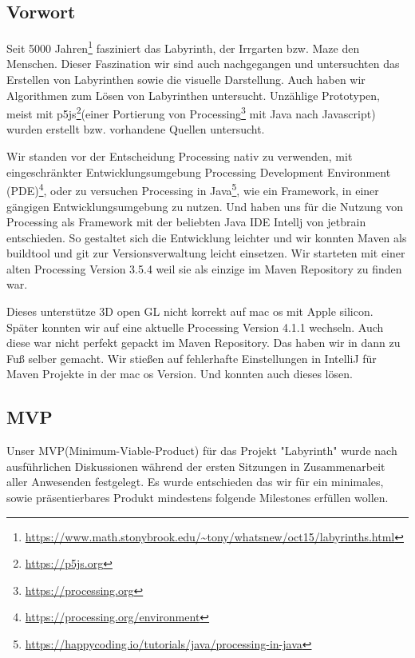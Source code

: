 
\subsection{Vorwort}\label{subsec:Vorwort}

Seit 5000 Jahren\footnote{\url{https://www.math.stonybrook.edu/~tony/whatsnew/oct15/labyrinths.html}} fasziniert das Labyrinth, der Irrgarten bzw. Maze den Menschen. Dieser Faszination wir sind auch nachgegangen und untersuchten das Erstellen von Labyrinthen sowie die visuelle Darstellung. Auch haben wir Algorithmen zum Lösen von Labyrinthen untersucht. Unzählige Prototypen, meist mit p5js\footnote{\url{https://p5js.org}}(einer Portierung von Processing\footnote{\url{https://processing.org}}  mit Java nach Javascript)  wurden erstellt bzw.  vorhandene Quellen untersucht.

	Wir standen vor der Entscheidung Processing nativ zu verwenden, mit eingeschränkter Entwicklungsumgebung Processing Development Environment (PDE)\footnote{\url{https://processing.org/environment}},  oder zu versuchen Processing in Java\footnote{\url{https://happycoding.io/tutorials/java/processing-in-java}}, wie ein Framework, in einer gängigen Entwicklungsumgebung zu nutzen. Und haben uns für die Nutzung von Processing als Framework mit der beliebten Java IDE Intellj von jetbrain entschieden. So gestaltet sich die Entwicklung leichter und wir konnten Maven als buildtool und git zur Versionsverwaltung leicht einsetzen. Wir starteten mit einer alten Processing Version 3.5.4 weil sie als einzige im Maven Repository zu finden war. 

	Dieses unterstütze 3D open GL nicht korrekt auf mac os mit Apple silicon. Später konnten wir auf eine aktuelle Processing Version 4.1.1 wechseln. Auch diese war nicht perfekt gepackt im Maven Repository. Das haben wir in dann zu Fuß selber gemacht. Wir stießen auf fehlerhafte Einstellungen in IntelliJ für Maven Projekte in der mac os Version. Und konnten auch dieses lösen.

\subsection{MVP}\label{subsec:mvp}
	Unser MVP(Minimum-Viable-Product) für das Projekt "Labyrinth"  wurde nach ausführlichen Diskussionen während der ersten Sitzungen in Zusammenarbeit aller Anwesenden festgelegt. Es wurde entschieden das wir für ein minimales, sowie präsentierbares Produkt mindestens folgende Milestones erfüllen wollen.
	
